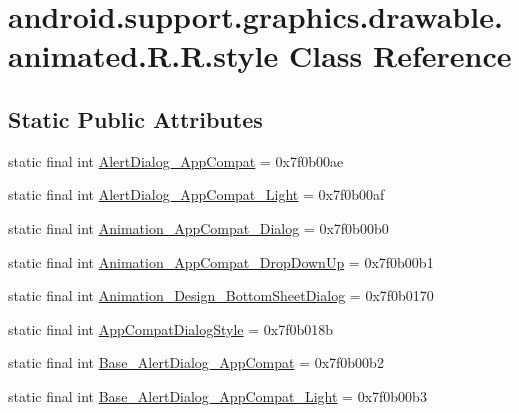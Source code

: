 \hypertarget{classandroid_1_1support_1_1graphics_1_1drawable_1_1animated_1_1_r_1_1style}{
\section{android.support.graphics.drawable.animated.R.R.style Class Reference}
\label{classandroid_1_1support_1_1graphics_1_1drawable_1_1animated_1_1_r_1_1style}
}
\subsection*{Static Public Attributes}
\begin{CompactItemize}
\item 
static final int \hyperlink{classandroid_1_1support_1_1graphics_1_1drawable_1_1animated_1_1_r_1_1style_cf3cacb5bb72affefdf11610902d67ad}{AlertDialog\_\-AppCompat} = 0x7f0b00ae
\item 
static final int \hyperlink{classandroid_1_1support_1_1graphics_1_1drawable_1_1animated_1_1_r_1_1style_b2d7b542870aef88174b09c5889d756a}{AlertDialog\_\-AppCompat\_\-Light} = 0x7f0b00af
\item 
static final int \hyperlink{classandroid_1_1support_1_1graphics_1_1drawable_1_1animated_1_1_r_1_1style_d0acaeb1622b369e45786732ca2edad1}{Animation\_\-AppCompat\_\-Dialog} = 0x7f0b00b0
\item 
static final int \hyperlink{classandroid_1_1support_1_1graphics_1_1drawable_1_1animated_1_1_r_1_1style_c2b8a52376180f63f0e3ec3022358c15}{Animation\_\-AppCompat\_\-DropDownUp} = 0x7f0b00b1
\item 
static final int \hyperlink{classandroid_1_1support_1_1graphics_1_1drawable_1_1animated_1_1_r_1_1style_03a95a8f2834a669d2edc776b4ef78ff}{Animation\_\-Design\_\-BottomSheetDialog} = 0x7f0b0170
\item 
static final int \hyperlink{classandroid_1_1support_1_1graphics_1_1drawable_1_1animated_1_1_r_1_1style_1d67a5b4094ba306c166c58c74a51e24}{AppCompatDialogStyle} = 0x7f0b018b
\item 
static final int \hyperlink{classandroid_1_1support_1_1graphics_1_1drawable_1_1animated_1_1_r_1_1style_81df6624d2b5891b0284259a5f8e08fa}{Base\_\-AlertDialog\_\-AppCompat} = 0x7f0b00b2
\item 
static final int \hyperlink{classandroid_1_1support_1_1graphics_1_1drawable_1_1animated_1_1_r_1_1style_b91c581957716020d826c12b935ee436}{Base\_\-AlertDialog\_\-AppCompat\_\-Light} = 0x7f0b00b3

\end{CompactItemize}

